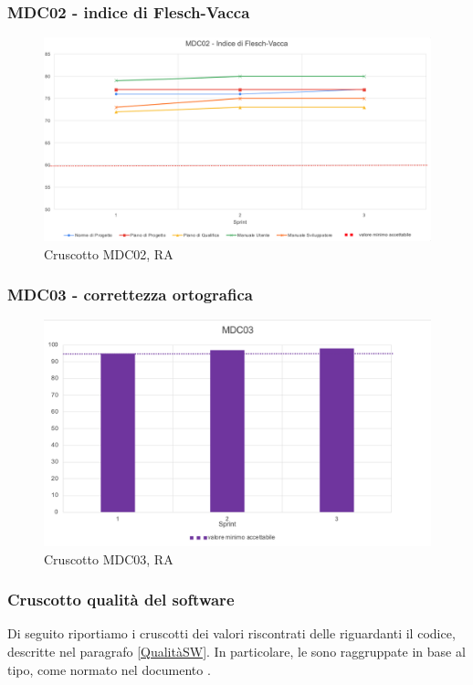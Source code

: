 \subsubsection*{MDC02 - indice di Flesch-Vacca}

\begin{figure}[H] 
    \centering
    \includegraphics[scale = 0.6]{immagini/ImmRA/MDC02.png}
    \caption{Cruscotto MDC02, RA}
\end{figure}

\subsubsection*{MDC03 - correttezza ortografica}

\begin{figure}[H] 
    \centering
    \includegraphics[scale = 0.8]{immagini/ImmRA/MDC03.png}
    \caption{Cruscotto MDC03, RA}
\end{figure}
\subsubsection{Cruscotto qualità del software}
Di seguito riportiamo i cruscotti dei valori riscontrati delle  riguardanti il codice, descritte nel paragrafo \ref{QualitàSW}. In particolare, le  sono raggruppate in base al tipo, come normato nel documento \NdP{}.

